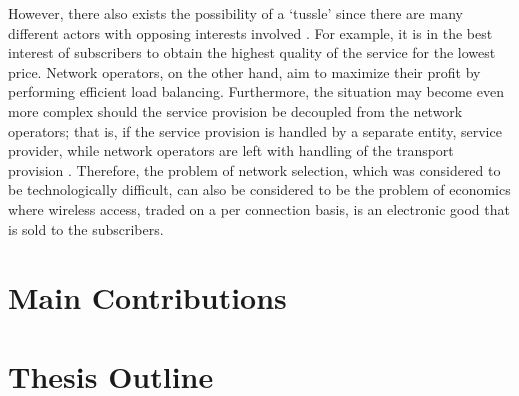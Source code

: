 However, there also exists the possibility of a `tussle' since there are many different actors with opposing interests involved \cite{Clark02}. For example, it is in the best interest of subscribers to obtain the highest quality of the service for the lowest price. Network operators, on the other hand, aim to maximize their profit by performing efficient load balancing. Furthermore, the situation may become even more complex should the service provision be decoupled from the network operators; that is, if the service provision is handled by a separate entity, service provider, while network operators are left with handling of the transport provision \cite{DMBushTussle09}. Therefore, the problem of network selection, which was considered to be technologically difficult, can also be considered to be the problem of economics where wireless access, traded on a per connection basis, is an electronic good that is sold to the subscribers.

\section{Main Contributions} %
\label{sec:main_contributions_introduction}


\section{Thesis Outline} %
\label{sec:thesis_outline_introduction}


